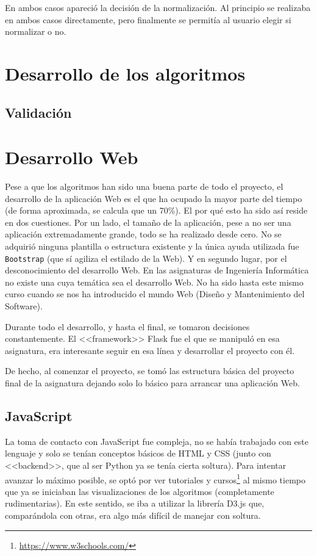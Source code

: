 En ambos casos apareció la decisión de la normalización. Al principio se
realizaba en ambos casos directamente, pero finalmente se permitía al usuario
elegir si normalizar o no.

\section{Desarrollo de los algoritmos}

\subsection{Validación}


\section{Desarrollo Web}

Pese a que los algoritmos han sido una buena parte de todo el proyecto, el
desarrollo de la aplicación Web es el que ha ocupado la mayor parte del tiempo
(de forma aproximada, se calcula que un 70\%). El por qué esto ha sido así
reside en dos cuestiones. Por un lado, el tamaño de la aplicación, pese a no ser
una aplicación extremadamente grande, todo se ha realizado desde cero. No se
adquirió ninguna plantilla o estructura existente y la única ayuda utilizada fue
\texttt{Bootstrap} (que sí agiliza el estilado de la Web). Y en segundo lugar,
por el desconocimiento del desarrollo Web. En las asignaturas de Ingeniería
Informática no existe una cuya temática sea el desarrollo Web. No ha sido hasta
este mismo curso cuando se nos ha introducido el mundo Web (Diseño y
Mantenimiento del Software).

Durante todo el desarrollo, y hasta el final, se tomaron decisiones
constantemente. El <<framework>> Flask fue el que se manipuló en esa asignatura,
era interesante seguir en esa línea y desarrollar el proyecto con él. 

De hecho, al comenzar el proyecto, se tomó las estructura básica del proyecto
final de la asignatura dejando solo lo básico para arrancar una aplicación Web.

\subsection{JavaScript}
La toma de contacto con JavaScript fue compleja, no se había trabajado con este
lenguaje y solo se tenían conceptos básicos de HTML y CSS (junto con
<<backend>>, que al ser Python ya se tenía cierta soltura). Para intentar
avanzar lo máximo posible, se optó por ver tutoriales y
cursos\footnote{\url{https://www.w3schools.com/}} al mismo tiempo que ya se
iniciaban las visualizaciones de los algoritmos (completamente rudimentarias).
En este sentido, se iba a utilizar la librería D3.js que, comparándola con
otras, era algo más difícil de manejar con soltura.

